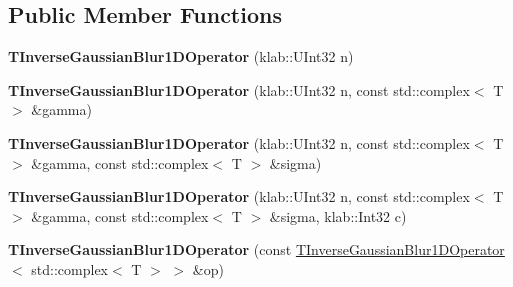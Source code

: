 \subsection*{Public Member Functions}
\begin{DoxyCompactItemize}
\item 
{\bfseries T\+Inverse\+Gaussian\+Blur1\+D\+Operator} (klab\+::\+U\+Int32 n)\hypertarget{classkl1p_1_1TInverseGaussianBlur1DOperator_3_01std_1_1complex_3_01T_01_4_01_4_a6addf7e5d26ffa54cc19108c8fc01623}{}\label{classkl1p_1_1TInverseGaussianBlur1DOperator_3_01std_1_1complex_3_01T_01_4_01_4_a6addf7e5d26ffa54cc19108c8fc01623}

\item 
{\bfseries T\+Inverse\+Gaussian\+Blur1\+D\+Operator} (klab\+::\+U\+Int32 n, const std\+::complex$<$ T $>$ \&gamma)\hypertarget{classkl1p_1_1TInverseGaussianBlur1DOperator_3_01std_1_1complex_3_01T_01_4_01_4_a7673ccca539b0d4a7e2a0505f3776852}{}\label{classkl1p_1_1TInverseGaussianBlur1DOperator_3_01std_1_1complex_3_01T_01_4_01_4_a7673ccca539b0d4a7e2a0505f3776852}

\item 
{\bfseries T\+Inverse\+Gaussian\+Blur1\+D\+Operator} (klab\+::\+U\+Int32 n, const std\+::complex$<$ T $>$ \&gamma, const std\+::complex$<$ T $>$ \&sigma)\hypertarget{classkl1p_1_1TInverseGaussianBlur1DOperator_3_01std_1_1complex_3_01T_01_4_01_4_ae65c39fb329e3926926de7b2f38a5bc4}{}\label{classkl1p_1_1TInverseGaussianBlur1DOperator_3_01std_1_1complex_3_01T_01_4_01_4_ae65c39fb329e3926926de7b2f38a5bc4}

\item 
{\bfseries T\+Inverse\+Gaussian\+Blur1\+D\+Operator} (klab\+::\+U\+Int32 n, const std\+::complex$<$ T $>$ \&gamma, const std\+::complex$<$ T $>$ \&sigma, klab\+::\+Int32 c)\hypertarget{classkl1p_1_1TInverseGaussianBlur1DOperator_3_01std_1_1complex_3_01T_01_4_01_4_acde9d94ff385e4daba0c4f48fd22a904}{}\label{classkl1p_1_1TInverseGaussianBlur1DOperator_3_01std_1_1complex_3_01T_01_4_01_4_acde9d94ff385e4daba0c4f48fd22a904}

\item 
{\bfseries T\+Inverse\+Gaussian\+Blur1\+D\+Operator} (const \hyperlink{classkl1p_1_1TInverseGaussianBlur1DOperator}{T\+Inverse\+Gaussian\+Blur1\+D\+Operator}$<$ std\+::complex$<$ T $>$ $>$ \&op)\hypertarget{classkl1p_1_1TInverseGaussianBlur1DOperator_3_01std_1_1complex_3_01T_01_4_01_4_ab70c48f5fa5fe912531dccbb670878aa}{}\label{classkl1p_1_1TInverseGaussianBlur1DOperator_3_01std_1_1complex_3_01T_01_4_01_4_ab70c48f5fa5fe912531dccbb670878aa}


\end{DoxyCompactItemize}
